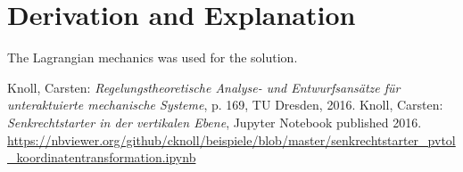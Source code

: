 \documentclass[10pt,a4paper]{article}
\begin{document}
	
	\section{Derivation and Explanation} %
	The Lagrangian mechanics was used for the solution.
	
	\begin{thebibliography}{10}		
		Knoll, Carsten: 
		\textit{Regelungstheoretische Analyse- und Entwurfsansätze für unteraktuierte mechanische Systeme}, p. 169, TU Dresden, 2016.
		Knoll, Carsten: 
		\textit{Senkrechtstarter in der vertikalen Ebene}, Jupyter Notebook published 2016. \\
		\url{https://nbviewer.org/github/cknoll/beispiele/blob/master/senkrechtstarter_pvtol_koordinatentransformation.ipynb}
	\end{thebibliography}
\end{document}
